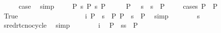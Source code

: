 \begin{isabellebody}
\ \ \isamarkupfalse%
\ \isamarkupfalse%
\ {\isacharquery}{\kern0pt}case\ \isamarkupfalse%
\ simp\isanewline
{}\isamarkupfalse%
\isanewline
\ \ \isamarkupfalse%
\ {\isacharparenleft}{\kern0pt}{}\ P{}\ s{}\ P{\isacharprime}{\kern0pt}\ s{}\ P{}{\isacharparenright}{\kern0pt}\isanewline
\ \ \isamarkupfalse%
\ \isamarkupfalse%
\ {\isachardoublequoteopen}P{}\ {\isasymTurnstile}\ {\isacharparenleft}{\kern0pt}{\isacharbraceleft}{\kern0pt}{\isacharbraceright}{\kern0pt}{\isacharcomma}{\kern0pt}\ s{}\ {\isasymbullet}\ s{}{\isacharparenright}{\kern0pt}\ {\isasymRightarrow}\ P{}{\isachardoublequoteclose}\isanewline
\ \ \ \ \isamarkupfalse%
{\isacharparenleft}{\kern0pt}cases\ {\isachardoublequoteopen}P{\isacharprime}{\kern0pt}\ {\isacharequal}{\kern0pt}\ P{}{\isachardoublequoteclose}{\isacharparenright}{\kern0pt}\isanewline
\ \ \ \ \ \ \isamarkupfalse%
\ True\isanewline
\ \ \ \ \ \ \isamarkupfalse%
\ {}{\isacharparenleft}{\kern0pt}{}{\isacharcomma}{\kern0pt}{}{\isacharparenright}{\kern0pt}\ \isamarkupfalse%
\ \isanewline
\ \ \ \ \ \ \ \ i{\isacharcolon}{\kern0pt}\ {\isachardoublequoteopen}P{}\ {\isasymturnstile}\ s{}\ {\isasymleadsto}\ P{}{\isachardoublequoteclose}\ {\isachardoublequoteopen}P{}\ {\isasymturnstile}\ s{}\ {\isasymleadsto}\isactrlsup {\isacharasterisk}{\kern0pt}\ P{}{\isachardoublequoteclose}\ \isamarkupfalse%
\ simp{\isacharplus}{\kern0pt}\isanewline
\ \ \ \ \ \ \isamarkupfalse%
\ {\isachardoublequoteopen}s{}\ {\isacharequal}{\kern0pt}\ {\isacharbrackleft}{\kern0pt}{\isacharbrackright}{\kern0pt}{\isachardoublequoteclose}\ \isanewline
\ \ \ \ \ \ \ \ \isamarkupfalse%
\ sred{\isacharunderscore}{\kern0pt}rtc{\isacharunderscore}{\kern0pt}no{\isacharunderscore}{\kern0pt}cycle\ \isamarkupfalse%
\ simp\isanewline
\ \ \ \ \ \ \isamarkupfalse%
\ i\ \isamarkupfalse%
\ {\isachardoublequoteopen}P{}\ {\isasymturnstile}\ {\isacharparenleft}{\kern0pt}s{}{\isasymbullet}s{}{\isacharparenright}{\kern0pt}\ {\isasymleadsto}\ P{}{\isachardoublequoteclose}\ \isamarkupfalse%

\end{isabellebody}
